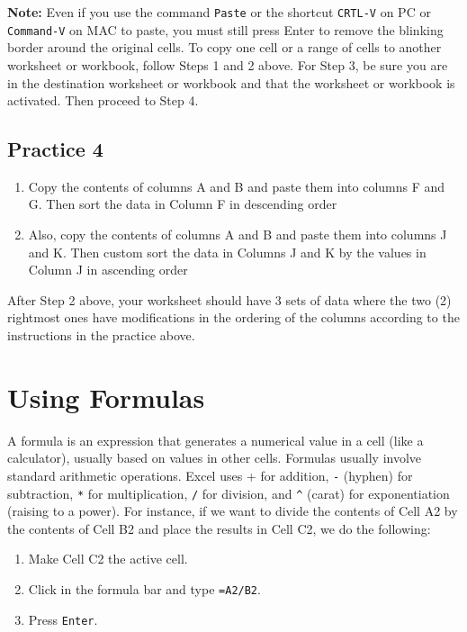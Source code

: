 \documentclass[
  12pt,
  letterpaper,
]{book}
\providecommand{\tightlist}{%
  \setlength{\itemsep}{0pt}\setlength{\parskip}{0pt}}
\begin{document}
\textbf{Note:} Even if you use the command \texttt{Paste} or the shortcut \texttt{CRTL-V} on PC or \texttt{Command-V} on MAC to paste, you must still press Enter to remove the blinking border around the original cells. To copy one cell or a range of cells to another worksheet or workbook, follow Steps 1 and 2 above. For Step
3, be sure you are in the destination worksheet or workbook and that the worksheet or workbook is activated. Then proceed to Step 4.

\hypertarget{practice-4}{%
\subsection{Practice 4}\label{practice-4}}

\begin{enumerate}
\def\labelenumi{\arabic{enumi}.}
\tightlist
\item
  Copy the contents of columns A and B and paste them into columns F and G. Then sort the data in Column F in descending order
\item
  Also, copy the contents of columns A and B and paste them into columns J and K. Then custom sort the data in Columns J and K by the values in Column J in ascending order
\end{enumerate}

After Step 2 above, your worksheet should have 3 sets of data where the two (2) rightmost ones have modifications in the ordering of the columns according to the instructions in the practice above.

\hypertarget{using-formulas}{%
\section{Using Formulas}\label{using-formulas}}

A formula is an expression that generates a numerical value in a cell (like a calculator), usually based on values in other cells.
Formulas usually involve standard arithmetic operations. Excel uses + for addition, \texttt{-} (hyphen) for subtraction, \texttt{*} for multiplication, \texttt{/} for division, and \texttt{\^{}} (carat) for exponentiation (raising to a power). For instance, if we want to divide the contents of Cell A2 by the contents of Cell B2 and place the results in Cell C2, we do the following:

\begin{enumerate}
\def\labelenumi{\arabic{enumi}.}
\tightlist
\item
  Make Cell C2 the active cell.
\item
  Click in the formula bar and type \texttt{=A2/B2}.
\item
  Press \texttt{Enter}.
\end{enumerate}
\end{document}
